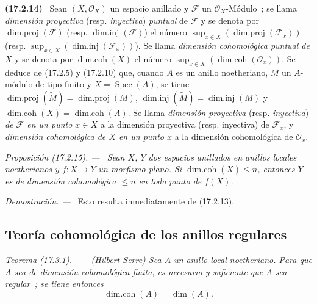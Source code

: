 \documentclass[10pt,oneside]{book}
\makeatletter
\newcommand{\setmanualcurrentlabel}[1]{\def\@currentlabel{#1}}
\newenvironment{env}[1][]{\setmanualcurrentlabel{#1}\par\medskip\noindent\textbf{(#1)}\ }{\par}
\newenvironment{proposition}[1][]{%
  \setmanualcurrentlabel{#1}\par\medskip\noindent\itshape Proposición (#1). ---\ }{\par}
\newenvironment{theorem}[1][]{%
  \setmanualcurrentlabel{#1}\par\medskip\noindent\itshape Teorema (#1). ---\ }{\par}
\newenvironment{proof}{%
  \par\medskip\noindent\textit{Demostración. ---\ }}{\par}
\makeatother
\begin{document}
\begin{env}[17.2.14]
\label{0.17.2.14-es}
Sean $(X,\mathscr{O}_X)$ un espacio anillado y $\mathscr{F}$ un
$\mathscr{O}_X$-Módulo~; se llama \emph{dimensión proyectiva} (resp.
\emph{inyectiva}) \emph{puntual} de $\mathscr{F}$ y se denota por
$\operatorname{dim.proj}(\mathscr{F})$ (resp.
$\operatorname{dim.inj}(\mathscr{F})$) el número
$\sup_{x\in X}(\operatorname{dim.proj}(\mathscr{F}_x))$ (resp.
$\sup_{x\in X}(\operatorname{dim.inj}(\mathscr{F}_x))$). Se llama
\emph{dimensión cohomológica puntual de $X$} y se denota por
$\operatorname{dim.coh}(X)$ el número
$\sup_{x\in X}(\operatorname{dim.coh}(\mathscr{O}_x))$. Se deduce de
(17.2.5) y (17.2.10) que, cuando $A$ es un anillo noetheriano, $M$ un
$A$-módulo de tipo finito y $X=\operatorname{Spec}(A)$, se tiene
$\operatorname{dim.proj}(\widetilde{M})=\operatorname{dim.proj}(M)$,
$\operatorname{dim.inj}(\widetilde{M})=\operatorname{dim.inj}(M)$ y
$\operatorname{dim.coh}(X)=\operatorname{dim.coh}(A)$. Se llama
\emph{dimensión proyectiva} (resp. \emph{inyectiva}) \emph{de $\mathscr{F}$ en
un punto $x\in X$} a la dimensión proyectiva (resp. inyectiva) de
$\mathscr{F}_x$, y \emph{dimensión cohomológica de $X$ en un punto $x$} a la
dimensión cohomológica de $\mathscr{O}_x$.
\end{env}

\begin{proposition}[17.2.15]
\label{0.17.2.15-es}
Sean $X$, $Y$ dos espacios anillados en anillos locales noetherianos y
$f:X\longrightarrow Y$ un morfismo plano. Si
$\operatorname{dim.coh}(X)\leq n$, entonces $Y$ es de dimensión cohomológica
$\leq n$ en todo punto de $f(X)$.
\end{proposition}

\begin{proof}
Esto resulta inmediatamente de (17.2.13).
\end{proof}

\subsection{Teoría cohomológica de los anillos regulares}
\label{subsection:0.17.3-es}

\begin{theorem}[17.3.1]
\label{0.17.3.1-es}
\textnormal{(Hilbert-Serre)} Sea $A$ un anillo local noetheriano. Para que $A$
sea de dimensión cohomológica finita, es necesario y suficiente que $A$ sea
regular~; se tiene entonces
\begin{equation}
\label{0.17.3.1.1-es}
\tag{17.3.1.1}
  \operatorname{dim.coh}(A)=\dim(A).
\end{equation}
\end{theorem}
\end{document}
